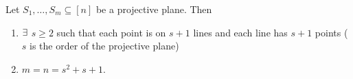 \documentclass[twoside]{article}
\begin{document}
\begin{Theorem}{}{}
	Let $S_1,\dots, S_m\subseteq[n]$ be a projective plane. Then\begin{enumerate}
		\item $\exists$ $s\geq 2$ such that each point is on $s+1$ lines and each line has $s+1$ points ($s$ is the order of the projective plane)
		\item $m=n=s^2+s+1$. 
	\end{enumerate}
	
\end{Theorem}
\end{document}
